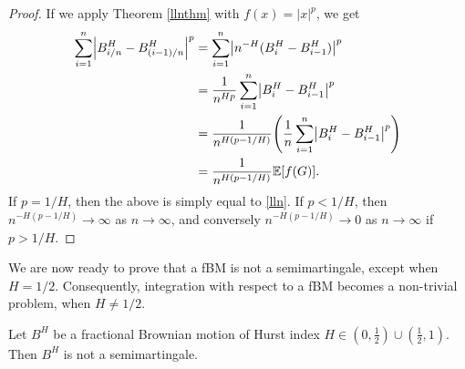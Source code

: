 \begin{proof}
    If we apply Theorem \ref{llnthm} with $f(x)=|x|^p$, we get
    \begin{align}
         \sum_{i=1}^{n}\left|B_{i/n}^{H}-B_{(i-1)/n}^{H}\right|^{p}&= \sum_{i=1}^{n}\left|n^{-H}(B_{i}^{H}-B_{i-1}^{H})\right|^{p}\\
         &= \frac{1}{n^{Hp}}\sum_{i=1}^{n}\left|B_{i}^{H}-B_{i-1}^{H}\right|^{p}\\
         &= \frac{1}{n^{H(p-1/H)}}\left(\frac{1}{n}\sum_{i=1}^{n}\left|B_{i}^{H}-B_{i-1}^{H}\right|^{p}\right)\\
         &= \frac{1}{n^{H(p-1/H)}}\E[f(G)].
    \end{align}
If $p=1/H$, then the above is simply equal to \eqref{lln}. If $p<1/H$, then $n^{-H(p-1/H)}\to \infty$ as $n\to \infty$, and conversely $n^{-H(p-1/H)}\to 0$ as $n\to \infty$ if $p>1/H$.
\end{proof}
We are now ready to prove that a fBM is not a semimartingale, except when $H=1/2$. Consequently, integration with respect to a fBM becomes a non-trivial problem, when $H\neq 1/2$.
\begin{thm}
    Let $B^H$ be a fractional Brownian motion of Hurst index $H\in (0,\frac{1}{2})\cup (\frac{1}{2},1)$. Then $B^H$ is not a semimartingale.
\end{thm}
